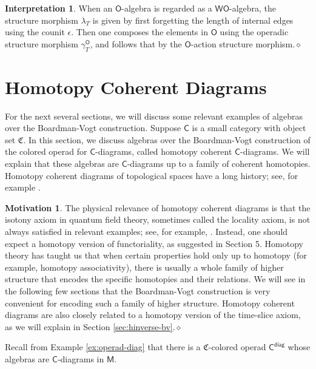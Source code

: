 \documentclass{amsbook}
\numberwithin{section}{chapter}
\numberwithin{subsection}{section}
\numberwithin{equation}{section}
\theoremstyle{plain}
\theoremstyle{definition}
\newtheorem{interpretation}[equation]{Interpretation}
\newtheorem{motivation}[equation]{Motivation}
\newcommand{\colorc}{\mathfrak{C}}
\newcommand{\C}{\mathsf{C}}
\newcommand{\M}{\mathsf{M}}
\renewcommand{\O}{\mathsf{O}}
\newcommand{\W}{\mathsf{W}}
\newcommand{\dqed}{\hfill$\diamond$}
\newcommand{\gammao}{\gamma^{\O}}
\newcommand{\Cdiag}{\C^{\mathsf{diag}}}
\newcommand{\wo}{\W\O}
\begin{document}
\begin{interpretation}
When an $\O$-algebra is regarded as a $\wo$-algebra, the structure morphism $\lambda_T$ is given by first forgetting the length of internal edges using the counit $\epsilon$.  Then one composes the elements in $\O$ using the operadic structure morphism $\gammao_T$, and follows that by the $\O$-action structure morphism.\dqed\end{interpretation}


\section{Homotopy Coherent Diagrams}\label{sec:hcdiagram}

For the next several sections, we will discuss some relevant examples of algebras over the Boardman-Vogt construction. Suppose $\C$ is a small category with object set $\colorc$.  In this section, we discuss algebras over the Boardman-Vogt construction of the colored operad for $\C$-diagrams, called homotopy coherent $\C$-diagrams.  We will explain that these algebras are $\C$-diagrams up to a family of coherent homotopies.  Homotopy coherent diagrams of topological spaces have a long history; see, for example \cite{berger-moerdijk-resolution,cordier-porter,cordier-porter2,vogt73}.  

\begin{motivation}
The physical relevance of homotopy coherent diagrams is that the isotony axiom in quantum field theory, sometimes called the locality axiom, is not always satisfied in relevant examples; see, for example, \cite{bdhs,bss17}.  Instead, one should expect a homotopy version of functoriality, as suggested in \cite{bs17} Section 5.  Homotopy theory has taught us that when certain properties hold only up to homotopy (for example, homotopy associativity), there is usually a whole family of higher structure that encodes the specific homotopies and their relations.  We will see in the following few sections that the Boardman-Vogt construction is very convenient for encoding such a family of higher structure.  Homotopy coherent diagrams are also closely related to a homotopy version of the time-slice axiom, as we will explain in Section \ref{sec:hinverse-bv}.\dqed  
\end{motivation}

Recall from Example \ref{ex:operad-diag} that there is a $\colorc$-colored operad $\Cdiag$ whose algebras are $\C$-diagrams in $\M$.
\end{document}
